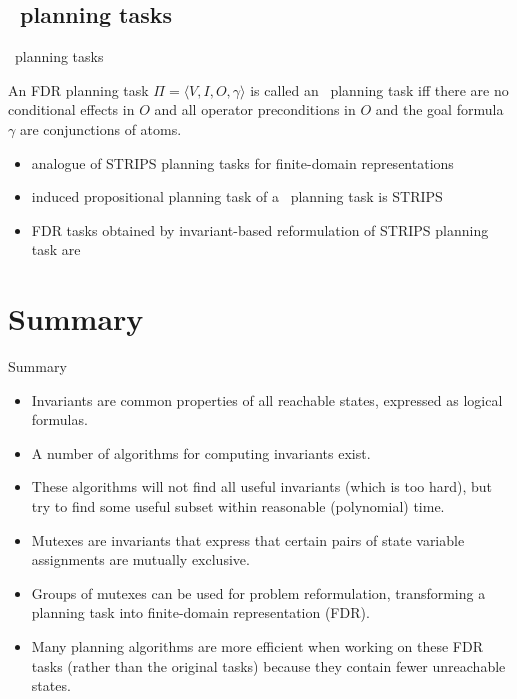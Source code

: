 \documentclass{gkibeamer}
\begin{document}
\subsection{\sasplus\ planning tasks}

\begin{frame}{\sasplus\ planning tasks}
  \begin{definition}
    An FDR planning task $\Pi = \langle V, I, O, \gamma\rangle$ is called
    an \alert{\sasplus\ planning task} iff there are no conditional
    effects in $O$ and all operator preconditions in $O$ and the goal
    formula $\gamma$ are conjunctions of atoms.
  \end{definition}
  \begin{itemize}
  \item analogue of STRIPS planning tasks for finite-domain
    representations
  \item induced propositional planning task of a \sasplus\ planning
    task is STRIPS
  \item FDR tasks obtained by invariant-based reformulation of
    STRIPS planning task are \sasplus
  \end{itemize}
\end{frame}

\section*{Summary}

\begin{frame}{Summary}
  \begin{itemize}
  \item \alert{Invariants} are common properties of all reachable
    states, expressed as logical formulas.
  \item A number of algorithms for \alert{computing invariants} exist.
  \item These algorithms will not find \alert{all useful invariants}
    (which is too hard), but try to find some useful subset within
    reasonable (polynomial) time.
  \item \alert{Mutexes} are invariants that express that certain pairs
    of state variable assignments are mutually exclusive.
  \item Groups of mutexes can be used for \alert{problem
    reformulation}, transforming a planning task into
    \alert{finite-domain representation (FDR)}.
  \item Many planning algorithms are more efficient when working on
    these FDR tasks (rather than the original tasks) because they
    contain \alert{fewer unreachable states}.
  \end{itemize}
\end{frame}
\end{document}
